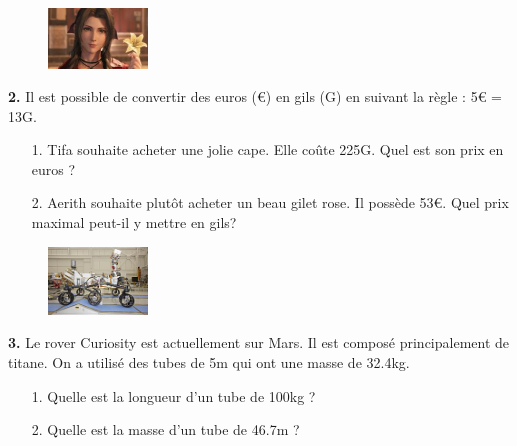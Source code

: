 \begin{minipage}[t]{0.25\textwidth}
  \begin{figure}[H]
    \centering
    \includegraphics[width=100px]{4x2-proportionnalite/ex2.jpg}
  \end{figure}
\end{minipage}
\begin{minipage}[t]{0.75\textwidth}
\textbf{2.} Il est possible de convertir des euros (€) en gils (G) en suivant la règle : 5€ = 13G.

\begin{enumerate}
  \item[1.] Tifa souhaite acheter une jolie cape. Elle coûte 225G. Quel est son prix en euros ? 
  \item[2.] Aerith souhaite plutôt acheter un beau gilet rose. Il possède 53€. Quel prix maximal peut-il y mettre en gils?
\end{enumerate}

\Pointilles[1]
\end{minipage}

\Pointilles[7]

\begin{minipage}[t]{0.25\textwidth}
  \begin{figure}[H]
    \centering
    \includegraphics[width=100px]{4x2-proportionnalite/ex3.jpg}
  \end{figure}
\end{minipage}
\begin{minipage}[t]{0.75\textwidth}
\textbf{3.} Le rover Curiosity est actuellement sur Mars. Il est composé principalement de titane. On a utilisé des tubes de 5m qui ont une masse de 32.4kg. 

\begin{enumerate}
  \item[1.] Quelle est la longueur d'un tube de 100kg ?
  \item[2.] Quelle est la masse d'un tube de 46.7m ? 
\end{enumerate}

\Pointilles[3]
\end{minipage}

